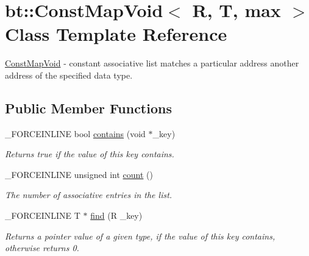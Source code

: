 \hypertarget{classbt_1_1_const_map_void}{\section{bt\-:\-:Const\-Map\-Void$<$ R, T, max $>$ Class Template Reference}
\label{classbt_1_1_const_map_void}
}


\hyperlink{classbt_1_1_const_map_void}{Const\-Map\-Void} -\/ constant associative list matches a particular address another address of the specified data type.  


\subsection*{Public Member Functions}
\begin{DoxyCompactItemize}
\item 
\hypertarget{classbt_1_1_const_map_void_ad9e1c3613397ee0b323ab09bd4900b5b}{\-\_\-\-F\-O\-R\-C\-E\-I\-N\-L\-I\-N\-E bool \hyperlink{classbt_1_1_const_map_void_ad9e1c3613397ee0b323ab09bd4900b5b}{contains} (void $\ast$\-\_\-key)}\label{classbt_1_1_const_map_void_ad9e1c3613397ee0b323ab09bd4900b5b}

\begin{DoxyCompactList}\small\item\em Returns true if the value of this key contains. \end{DoxyCompactList}\item 
\hypertarget{classbt_1_1_const_map_void_add9ead8083eb94af385db760f8fbab7b}{\-\_\-\-F\-O\-R\-C\-E\-I\-N\-L\-I\-N\-E unsigned int \hyperlink{classbt_1_1_const_map_void_add9ead8083eb94af385db760f8fbab7b}{count} ()}\label{classbt_1_1_const_map_void_add9ead8083eb94af385db760f8fbab7b}

\begin{DoxyCompactList}\small\item\em The number of associative entries in the list. \end{DoxyCompactList}\item 
\hypertarget{classbt_1_1_const_map_void_aefbc44a5cce89b4af02110f9c57d5d92}{\-\_\-\-F\-O\-R\-C\-E\-I\-N\-L\-I\-N\-E T $\ast$ \hyperlink{classbt_1_1_const_map_void_aefbc44a5cce89b4af02110f9c57d5d92}{find} (R \-\_\-key)}\label{classbt_1_1_const_map_void_aefbc44a5cce89b4af02110f9c57d5d92}

\begin{DoxyCompactList}\small\item\em Returns a pointer value of a given type, if the value of this key contains, otherwise returns 0. \end{DoxyCompactList}\end{DoxyCompactItemize}


